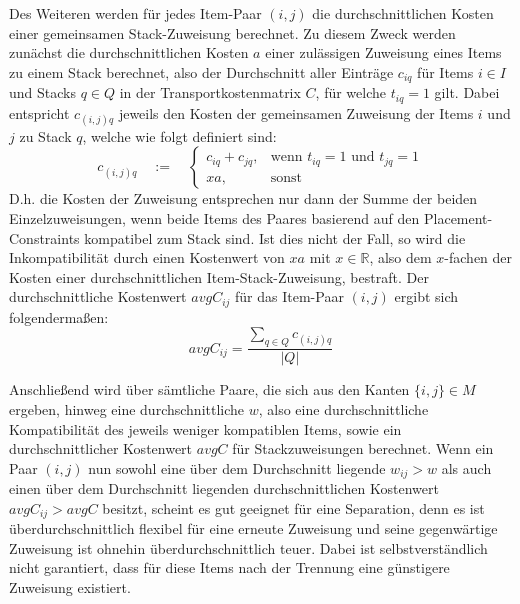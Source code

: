 Des Weiteren werden für jedes Item-Paar $(i, j)$ die durchschnittlichen Kosten einer gemeinsamen Stack-Zuweisung berechnet.
Zu diesem Zweck werden zunächst die durchschnittlichen Kosten $a$ einer zulässigen Zuweisung eines Items zu einem Stack berechnet,
also der Durchschnitt aller Einträge $c_{iq}$ für Items $i \in I$ und Stacks $q \in Q$ in der Transportkostenmatrix $C$, für
welche $t_{iq} = 1$ gilt. Dabei entspricht $c_{(i, j)q}$ jeweils den Kosten der gemeinsamen Zuweisung der Items $i$ und $j$ zu Stack $q$,
welche wie folgt definiert sind:
\[
    c_{(i, j)q} \quad := \quad
\begin{cases}
    c_{iq} + c_{jq}, & \text{wenn $t_{iq} = 1$ und $t_{jq} = 1$}\\
    xa, & \text{sonst}
\end{cases}
\]
D.h. die Kosten der Zuweisung entsprechen nur dann der Summe der beiden Einzelzuweisungen, wenn beide Items des Paares basierend
auf den Placement-Constraints kompatibel zum Stack sind. Ist dies nicht der Fall, so wird die Inkompatibilität durch
einen Kostenwert von $xa$ mit $x \in \mathbb{R}$, also dem $x$-fachen der Kosten einer durchschnittlichen Item-Stack-Zuweisung, bestraft. Der durchschnittliche Kostenwert $avgC_{ij}$ für das Item-Paar $(i, j)$ ergibt sich folgendermaßen:
\[ avgC_{ij} = \frac{\sum_{q \in Q} c_{(i, j)q}}{|Q|}  \]

Anschließend wird über sämtliche Paare, die sich aus den Kanten $\{i, j\} \in M$ ergeben, hinweg eine durchschnittliche  $w$, also eine durchschnittliche Kompatibilität des jeweils weniger kompatiblen Items, sowie ein durchschnittlicher Kostenwert $avgC$ für Stackzuweisungen berechnet. Wenn ein Paar $(i, j)$ nun sowohl eine über dem Durchschnitt liegende  $w_{ij} > w$ als auch einen über dem Durchschnitt liegenden durchschnittlichen Kostenwert $avgC_{ij} > avgC$ besitzt, scheint es gut geeignet für eine Separation,
denn es ist überdurchschnittlich flexibel für eine erneute Zuweisung und seine gegenwärtige Zuweisung ist ohnehin überdurchschnittlich teuer.
Dabei ist selbstverständlich nicht garantiert, dass für diese Items nach der Trennung eine günstigere Zuweisung existiert.

